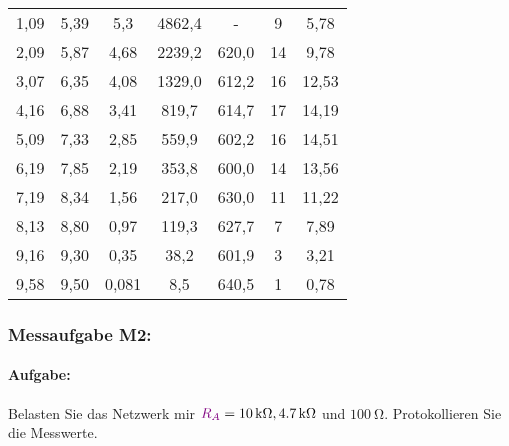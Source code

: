 \documentclass[a4paper,titlepage,parskip]{scrreprt}
\newcommand{\widerstand}[1]{\textcolor{violet}{#1}}
\begin{document}
\begin{center}
\begin{table}[!hbtp]
\begin{center}
\begin{tabular}{ccccccc}
                                1,09 & 5,39 & 5,3 & 4862,4 & - & 9 & 5,78\\
                                2,09 & 5,87 & 4,68 & 2239,2 & 620,0 & 14 & 9,78\\
                                3,07 & 6,35 & 4,08 & 1329,0 & 612,2 & 16 & 12,53\\
                                4,16 & 6,88 & 3,41 & 819,7 & 614,7 & 17 & 14,19\\
                                5,09 & 7,33 & 2,85 & 559,9 & 602,2 & 16 & 14,51\\
                                6,19 & 7,85 & 2,19 & 353,8 & 600,0 & 14 & 13,56\\
                                7,19 & 8,34 & 1,56 & 217,0 & 630,0 & 11 & 11,22\\
                                8,13 & 8,80 & 0,97 & 119,3 & 627,7 & 7 & 7,89\\
                                9,16 & 9,30 & 0,35 & 38,2 & 601,9 & 3 & 3,21\\
                                9,58 & 9,50 & 0,081 & 8,5 & 640,5 & 1 & 0,78\\
                            \end{tabular}
                        \end{center}
                    \end{table}
                \end{center}
           \subsubsection{Messaufgabe M2:}
               \paragraph{Aufgabe:}Belasten Sie das Netzwerk mir $\widerstand{R_A} = \SI{10}{\kilo\ohm}, \SI{4,7}{\kilo\ohm}$ und $\SI{100}{\ohm}$.
               Protokollieren Sie die Messwerte.

			   \pagebreak
\end{document}
